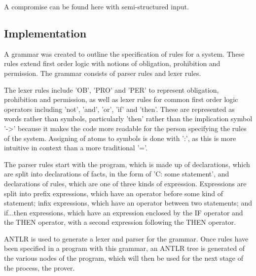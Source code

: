 \documentclass{l4proj}
\begin{document}
A compromise can be found here with semi-structured input. 



\subsection{Implementation}
A grammar was created to outline the specification of rules for a system. These rules extend first order logic with notions of obligation, prohibition and permission. The grammar consists of parser rules and lexer rules. 

The lexer rules include 'OB', 'PRO' and 'PER' to represent obligation, prohibition and permission, as well as lexer rules for common first order logic operators including 'not', 'and', 'or', 'if' and 'then'. These are represented as words rather than symbols, particularly 'then' rather than the implication symbol '->' because it makes the code more readable for the person specifying the rules of the system. Assigning of atoms to symbols is done with ':', as this is more intuitive in context than a more traditional '='. 

The parser rules start with the program, which is made up of declarations, which are split into declarations of facts, in the form of 'C: some statement', and declarations of rules, which are one of three kinds of expression. Expressions are split into prefix expressions, which have an operator before some kind of statement; infix expressions, which have an operator between two statements; and if...then expressions, which have an expression enclosed by the IF operator and the THEN operator, with a second expression following the THEN operator. 

ANTLR is used to generate a lexer and parser for the grammar. Once rules have been specified in a program with this grammar, an ANTLR tree is generated of the various nodes of the program, which will then be used for the next stage of the process, the prover. 

\end{document}
